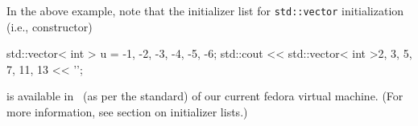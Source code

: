 In the above example,
note that the initializer list for \verb!std::vector! initialization
(i.e., constructor)
\begin{console}[fontsize=\small]
std::vector< int > u = {-1, -2, -3, -4, -5, -6};
std::cout << std::vector< int >{2, 3, 5, 7, 11, 13} << '\n';
\end{console}
is available in \gpp\ (as per the  standard) of our current
fedora virtual machine.
(For more information, see section on initializer lists.)
